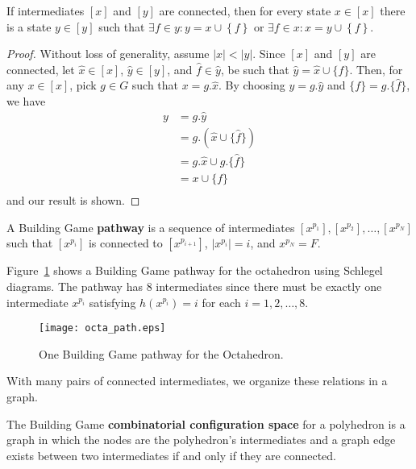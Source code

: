 \begin{mylem}
If intermediates $\left[x\right]$ and $\left[y\right]$ are connected, then for every state $x \in \left[x\right]$ there is a state $y \in \left[y\right]$ such that $\exists f \in y: y = x \cup \left\{f\right\}$ or $\exists f \in x: x = y \cup \left\{f\right\}$.
\end{mylem}
\begin{proof}
  Without loss of generality, assume $|x| < |y|$. Since $[x]$ and $[y]$ are connected, let $\hat{x} \in [x]$, $\hat{y} \in [y]$, and $\hat{f} \in \hat{y}$, be such that $\hat{y} = \hat{x}\cup\{\hat{f}\}$. Then, for any $x \in [x]$, pick $g \in G$ such that $x = g.\hat{x}$. By choosing $y = g.\hat{y}$ and $\{f\} = g.\{\hat{f}\}$, we have
\begin{align}
  y &= g.\hat{y} \\
  &= g.(\hat{x}\cup\{\hat{f}\}) \\
  &= g.\hat{x}\cup g.\{\hat{f}\} \\
  &= x \cup \{f\} \\
\end{align}    
and our result is shown.
\end{proof}


\begin{mydef}
A Building Game \textbf{pathway} is a sequence of intermediates $[x^{p_1}], [x^{p_2}], \dots, [x^{p_N}]$ such that  $[x^{p_i}]$ is connected to $[x^{p_{i+1}}]$, $|x^{p_i}| = i$, and $x^{p_N} = F$.
\end{mydef}

 Figure~\ref{fig:OctaPath} shows a Building Game pathway for the octahedron using Schlegel diagrams. The pathway has $8$ intermediates since there must be exactly one intermediate $x^{p_i}$ satisfying $h\left(x^{p_i}\right) = i$ for each $i = 1,2,\dots,8$.

\begin{figure}[ht]
\texttt{[image: octa\_path.eps]}
\caption{One Building Game pathway for the Octahedron.}
\label{fig:OctaPath}
\end{figure}

With many pairs of connected intermediates, we organize these relations in a graph.

\begin{mydef}
The Building Game \textbf{combinatorial configuration space} for a polyhedron is a graph in which the nodes are the polyhedron's intermediates and a graph edge exists between two intermediates if and only if they are connected. 
\end{mydef}

